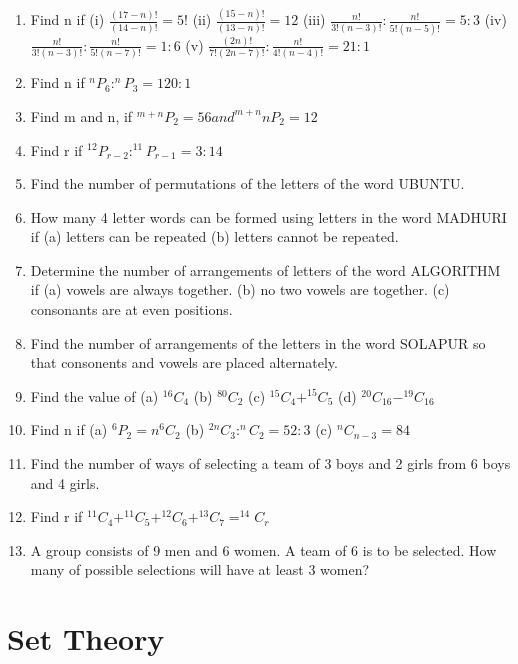 \documentclass[14pt]{article}
\begin{document}
\begin{multicols}{2}
\begin{enumerate}[resume]
\item Find n if
(i) $\frac{(17-n)!}{(14-n)!}= 5!$
(ii) $\frac{(15-n)!}{(13-n)!}= 12$
(iii) $\frac{n!}{3!(n-3)!}:\frac{n!}{5!(n-5)!}=5:3$
(iv) $\frac{n!}{3!(n-3)!}:\frac{n!}{5!(n-7)!}=1:6$
(v) $\frac{(2n)!}{7!(2n-7)!}:\frac{n!}{4!(n-4)!}=21:1$ 

\item Find n if $^nP_6 : ^nP_3=120:1$

\item Find m and n, if $^{m+n}P_2 = 56 and ^{m+n}nP_2=12$

\item Find r if $^12P_{r-2} : ^11P_{r-1}=3:14$

\item Find the number of permutations of the
letters of the word UBUNTU.

\item How many 4 letter words can be formed
using letters in the word MADHURI if
(a) letters can be repeated (b) letters cannot
be repeated.



\item Determine the number of arrangements of
letters of the word ALGORITHM if
(a) vowels are always together.
(b) no two vowels are together.
(c) consonants are at even positions.

\item Find the number of arrangements of the letters
in the word SOLAPUR so that consonents
and vowels are placed alternately.

\item Find the value of  (a) $ ^{16}C_4 $
(b)  $ ^{80}C_2$
(c)  $ ^{15}C_4 + ^{15}C_5 $
(d)  $ ^{20}C_{16} - ^{19}C_{16} $

\item Find n if  (a) $ ^6P_2 = n ^6C_2 $
(b)  $ ^{2n}C_3 : ^nC_2 = 52:3$
(c)  $ ^nC_{n-3}=84$

\item Find the number of ways of selecting a team
of 3 boys and 2 girls from 6 boys and 4 girls.

\item Find r if  $ ^{11}C_4 + ^{11}C_5 + ^{12}C_6 +  ^{13}C_7=^{14}C_r$
 
 \item A group consists of 9 men and 6 women.
A team of 6 is to be selected. How many
of possible selections will have at least
3 women?
\end{enumerate} 


\section{Set Theory}
\noindent
\begin{enumerate}[resume]


\end{enumerate}
\end{multicols}
\end{document}
